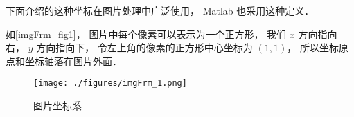 
下面介绍的这种坐标在图片处理中广泛使用， Matlab 也采用这种定义．

如\autoref{imgFrm_fig1}， 图片中每个像素可以表示为一个正方形， 我们 $x$ 方向指向右， $y$ 方向指向下， 令左上角的像素的正方形中心坐标为 $(1, 1)$， 所以坐标原点和坐标轴落在图片外面．

\begin{figure}[ht]
\centering
\texttt{[image: ./figures/imgFrm\_1.png]}
\caption{图片坐标系} \label{imgFrm_fig1}
\end{figure}
